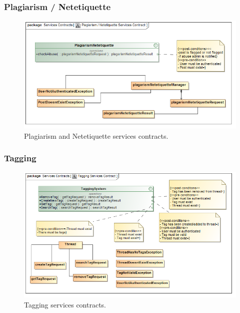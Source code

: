 \documentclass [a4paper,12pt] {article}
\begin{document}
		\subsubsection{Plagiarism / Netetiquette}
			\begin{figure}[H]
				\centering
				\includegraphics[width=1.0\textwidth]{PlagiarismNetetiquetteSC.png}
				\caption{Plagiarism and Netetiquette services contracts.}
			\end{figure}
		\subsubsection{Tagging}
			\begin{figure}[H]
				\centering
				\includegraphics[width=1.0\textwidth]{TaggingSC.png}
				\caption{Tagging services contracts.}
			\end{figure}
\end{document}
